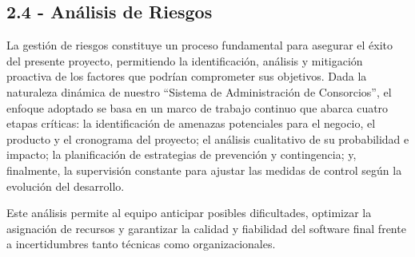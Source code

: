 \subsection{2.4 - Análisis de Riesgos}

La gestión de riesgos constituye un proceso fundamental para asegurar el éxito del presente proyecto, permitiendo la identificación, análisis y mitigación proactiva de los factores que podrían comprometer sus objetivos. Dada la naturaleza dinámica de nuestro ``Sistema de Administración de Consorcios'', el enfoque adoptado se basa en un marco de trabajo continuo que abarca cuatro etapas críticas: la identificación de amenazas potenciales para el negocio, el producto y el cronograma del proyecto; el análisis cualitativo de su probabilidad e impacto; la planificación de estrategias de prevención y contingencia; y, finalmente, la supervisión constante para ajustar las medidas de control según la evolución del desarrollo.  

Este análisis permite al equipo anticipar posibles dificultades, optimizar la asignación de recursos y garantizar la calidad y fiabilidad del software final frente a incertidumbres tanto técnicas como organizacionales.

